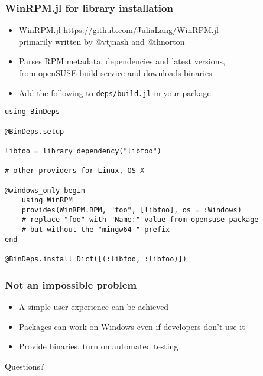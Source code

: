 \documentclass[compressed,dvips,letter]{beamer}
\begin{document}
\begin{frame}[fragile]\frametitle{WinRPM.jl for library installation}

\begin{itemize}
  \item WinRPM.jl \url{https://github.com/JuliaLang/WinRPM.jl} \\
  primarily written by {\selectfont @vtjnash} and {\selectfont @ihnorton}
  \item Parses RPM metadata, dependencies and latest versions, \\
  from openSUSE build service and downloads binaries
  \item Add the following to \texttt{deps/build.jl} in your package
\end{itemize}
{\scriptsize
\begin{verbatim}
using BinDeps

@BinDeps.setup

libfoo = library_dependency("libfoo")

# other providers for Linux, OS X

@windows_only begin
    using WinRPM
    provides(WinRPM.RPM, "foo", [libfoo], os = :Windows)
    # replace "foo" with "Name:" value from opensuse package
    # but without the "mingw64-" prefix
end

@BinDeps.install Dict([(:libfoo, :libfoo)])
\end{verbatim}
}
\end{frame}
%
%


\begin{frame}[fragile]\frametitle{Not an impossible problem}

\begin{itemize}
  \item A simple user experience can be achieved
  \item Packages can work on Windows even if developers don't use it
  \item Provide binaries, turn on automated testing
\end{itemize}

\vspace{20pt}

\center
Questions?

\end{frame}
%
%
\end{document}
